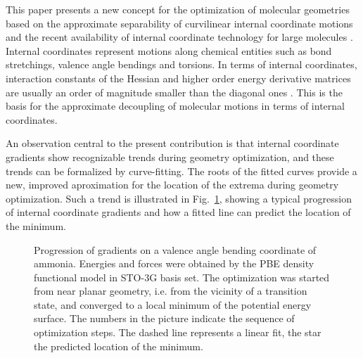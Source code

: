 \documentclass[prl,twocolumn,showpacs,twocolumngrid,superbib]{revtex4}
\begin{document}
This paper presents a new concept for the optimization of molecular 
geometries based on the approximate separability of 
curvilinear internal coordinate motions
and the recent availability of internal coordinate technology 
for large molecules
\cite{paizs_coordtrf1,nemeth_coordtrf1,paizs_coordtrf2,nemeth_coordtrf2}.  
Internal coordinates represent motions along chemical entities 
such as bond stretchings, valence angle bendings 
and torsions. In terms of internal coordinates,
interaction constants of the Hessian and higher order 
energy derivative matrices are usually an order of 
magnitude smaller than the diagonal ones 
\cite{pulay_69,fogarasi_diaghess,Pulay_natural_internals,pulay_review,pulay_dynamics}.
This is the basis for the approximate decoupling of molecular motions
in terms of internal coordinates.

An observation central to 
the present contribution is that internal coordinate gradients 
show recognizable trends during geometry optimization, 
and these trends can be formalized by curve-fitting.
The roots of the fitted curves provide a new, improved
aproximation for the location of the extrema during geometry optimization.
Such a trend is illustrated in Fig.~\ref{NH3outp6}, 
showing a typical progression of 
internal coordinate gradients and how a fitted line can predict the location
of the minimum.

\begin{figure}[h]
\caption{
Progression of gradients on a valence angle bending coordinate of
ammonia. Energies and forces were obtained by the PBE 
density functional model in STO-3G basis set.
The optimization was started from near planar geometry, i.e.
from the vicinity of a transition state, and converged to a local 
minimum of the potential energy surface. The numbers in the picture
indicate the sequence of optimization steps. The dashed line represents
a linear fit, the star the predicted location of the minimum.}
\label{NH3outp6}
\end{figure}
\end{document}
